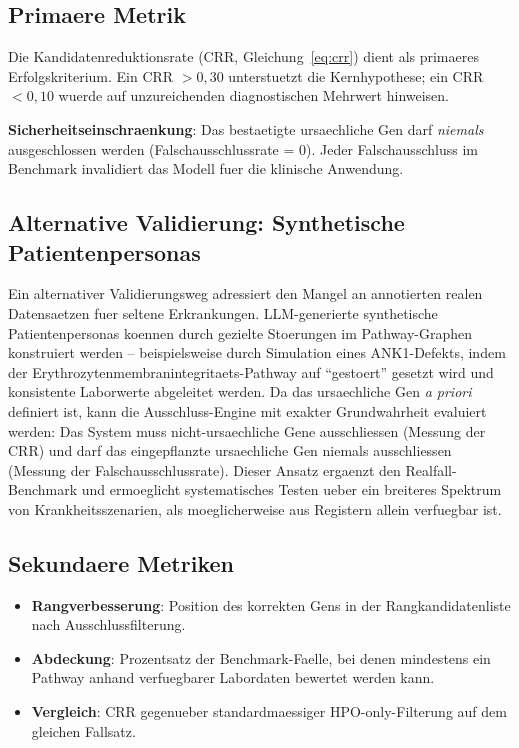 \documentclass[12pt,a4paper]{article}
\begin{document}
\subsection{Primaere Metrik}

Die Kandidatenreduktionsrate (CRR, Gleichung~\eqref{eq:crr}) dient als primaeres Erfolgskriterium. Ein CRR $> 0{,}30$ unterstuetzt die Kernhypothese; ein CRR $< 0{,}10$ wuerde auf unzureichenden diagnostischen Mehrwert hinweisen.

\textbf{Sicherheitseinschraenkung}: Das bestaetigte ursaechliche Gen darf \emph{niemals} ausgeschlossen werden (Falschausschlussrate = 0). Jeder Falschausschluss im Benchmark invalidiert das Modell fuer die klinische Anwendung.

\subsection{Alternative Validierung: Synthetische Patientenpersonas}

Ein alternativer Validierungsweg adressiert den Mangel an annotierten realen Datensaetzen fuer seltene Erkrankungen. LLM-generierte synthetische Patientenpersonas koennen durch gezielte Stoerungen im Pathway-Graphen konstruiert werden -- beispielsweise durch Simulation eines ANK1-Defekts, indem der Erythrozytenmembranintegritaets-Pathway auf "`gestoert"' gesetzt wird und konsistente Laborwerte abgeleitet werden. Da das ursaechliche Gen \emph{a priori} definiert ist, kann die Ausschluss-Engine mit exakter Grundwahrheit evaluiert werden: Das System muss nicht-ursaechliche Gene ausschliessen (Messung der CRR) und darf das eingepflanzte ursaechliche Gen niemals ausschliessen (Messung der Falschausschlussrate). Dieser Ansatz ergaenzt den Realfall-Benchmark und ermoeglicht systematisches Testen ueber ein breiteres Spektrum von Krankheitsszenarien, als moeglicherweise aus Registern allein verfuegbar ist.

\subsection{Sekundaere Metriken}

\begin{itemize}
    \item \textbf{Rangverbesserung}: Position des korrekten Gens in der Rangkandidatenliste nach Ausschlussfilterung.
    \item \textbf{Abdeckung}: Prozentsatz der Benchmark-Faelle, bei denen mindestens ein Pathway anhand verfuegbarer Labordaten bewertet werden kann.
    \item \textbf{Vergleich}: CRR gegenueber standardmaessiger HPO-only-Filterung auf dem gleichen Fallsatz.
\end{itemize}
\end{document}
